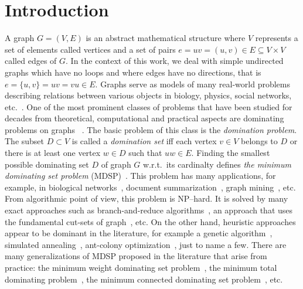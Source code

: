 \documentclass[dvipsnames,format=sigconf,anonymous=true,review=true]{acmart}
\begin{document}
\section{Introduction}
A graph $G=(V,E)$ is an abstract mathematical structure 
where $V$ represents a set of elements called vertices and   a set of pairs $e = uv =(u, v)  \in E \subseteq V \times V$ called edges of $G$. In the context of this work, we deal with  simple undirected graphs which have no loops and where edges have no directions, that is $e = \{u,v\}  = uv = vu \in E$.   Graphs serve as models of many real-world problems describing relations between various objects in biology, physics, social networks,  etc.~\cite{mashaghi2004investigation,pirzada2007applications,shah2019characterizing,doi:10.1137/S0895480100375831}. One of the most prominent classes of problems that have been studied for decades from theoretical, computational and practical aspects are dominating problems on graphs~ \cite{haynes2013fundamentals}. The basic problem of this class is the \textit{domination problem}. The subset $D \subset V$ is called a \emph{domination set} iff each vertex $v\in V$ belongs to $D$ or there is at least one vertex $w\in D$ such that $uw\in E$. Finding the smallest possible dominating set $D$ of graph $G$ w.r.t.\ its cardinalty defines \emph{the minimum dominating set problem} (MDSP)~\cite{grandoni2006note}. This problem has many applications, for example, in biological networks~\cite{nacher2016minimum}, document summarization~\cite{shen2010multi}, graph mining~\cite{chalupa2018order},  etc. From algorithmic point of view, this problem is NP--hard. It is solved by many exact approaches such as branch-and-reduce algorithms~\cite{van2011exact}, an approach that uses the fundamental cut-sets of graph~\cite{karci2020new}, etc. On the other hand, heuristic approaches appear to be dominant in the literature, for example a genetic algorithm~\cite{hedar2010hybrid}, simulated annealing~\cite{hedar2012simulated}, ant-colony optimization~\cite{ho2006enhanced}, just to name a few. There are many generalizations of MDSP proposed in the literature that arise from practice: the minimum weight dominating set problem~\cite{romania2010ant}, the minimum total dominating problem~\cite{yuan2019novel}, the minimum connected dominating set problem~\cite{butenko2004new}, etc.
\end{document}
